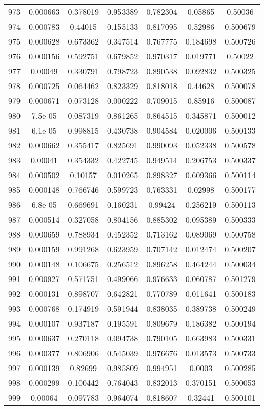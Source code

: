 \begin{table}
\begin{tabular}{c|c|c|c|c|c|c}
973 & 0.000663 & 0.378019 & 0.953389 & 0.782304 & 0.05865 & 0.50036\\
974 & 0.000783 & 0.44015 & 0.155133 & 0.817095 & 0.52986 & 0.500679\\
975 & 0.000628 & 0.673362 & 0.347514 & 0.767775 & 0.184698 & 0.500726\\
976 & 0.000156 & 0.592751 & 0.679852 & 0.970317 & 0.019771 & 0.50022\\
977 & 0.00049 & 0.330791 & 0.798723 & 0.890538 & 0.092832 & 0.500325\\
978 & 0.000725 & 0.064462 & 0.823329 & 0.818018 & 0.44628 & 0.500078\\
979 & 0.000671 & 0.073128 & 0.000222 & 0.709015 & 0.85916 & 0.500087\\
980 & 7.5e-05 & 0.087319 & 0.861265 & 0.864515 & 0.345871 & 0.500012\\
981 & 6.1e-05 & 0.998815 & 0.430738 & 0.904584 & 0.020006 & 0.500133\\
982 & 0.000662 & 0.355417 & 0.825691 & 0.990093 & 0.052338 & 0.500578\\
983 & 0.00041 & 0.354332 & 0.422745 & 0.949514 & 0.206753 & 0.500337\\
984 & 0.000502 & 0.10157 & 0.010265 & 0.898327 & 0.609366 & 0.500114\\
985 & 0.000148 & 0.766746 & 0.599723 & 0.763331 & 0.02998 & 0.500177\\
986 & 6.8e-05 & 0.669691 & 0.160231 & 0.99424 & 0.256219 & 0.500113\\
987 & 0.000514 & 0.327058 & 0.804156 & 0.885302 & 0.095389 & 0.500333\\
988 & 0.000659 & 0.788934 & 0.452352 & 0.713162 & 0.089069 & 0.500758\\
989 & 0.000159 & 0.991268 & 0.623959 & 0.707142 & 0.012474 & 0.500207\\
990 & 0.000148 & 0.106675 & 0.256512 & 0.896258 & 0.464244 & 0.500034\\
991 & 0.000927 & 0.571751 & 0.499066 & 0.976633 & 0.060787 & 0.501279\\
992 & 0.000131 & 0.898707 & 0.642821 & 0.770789 & 0.011641 & 0.500183\\
993 & 0.000768 & 0.174919 & 0.591944 & 0.838035 & 0.389738 & 0.500249\\
994 & 0.000107 & 0.937187 & 0.195591 & 0.809679 & 0.186382 & 0.500194\\
995 & 0.000637 & 0.270118 & 0.094738 & 0.790105 & 0.663983 & 0.500331\\
996 & 0.000377 & 0.806906 & 0.545039 & 0.976676 & 0.013573 & 0.500733\\
997 & 0.000139 & 0.82699 & 0.985809 & 0.994951 & 0.0003 & 0.500285\\
998 & 0.000299 & 0.100442 & 0.764043 & 0.832013 & 0.370151 & 0.500053\\
999 & 0.00064 & 0.097783 & 0.964074 & 0.818607 & 0.32441 & 0.500101\\
\end{tabular}
\end{table}